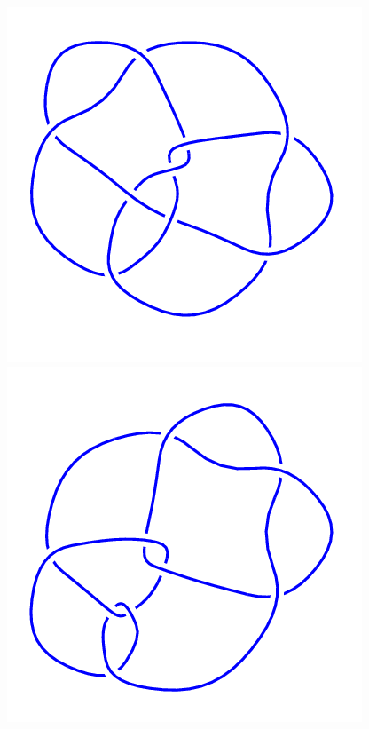 \begin{figure}[H]
    \begin{minipage}[b]{.18\linewidth}
        \centering
        \includegraphics[width=\linewidth]{../data/9_41.png}
    \end{minipage}
    \begin{minipage}[b]{.18\linewidth}
        \centering
        \includegraphics[width=\linewidth]{../data/9_42.png}

\end{minipage}
\end{figure}
